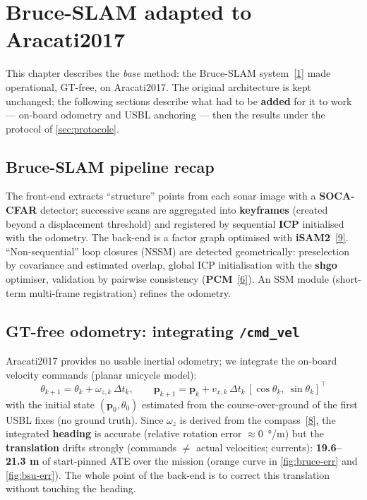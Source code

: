 \section{Bruce-SLAM adapted to Aracati2017}
\label{sec:chap1}

This chapter describes the \emph{base} method: the Bruce-SLAM system~\hyperref[bib:bruceslam]{[1]} made
operational, GT-free, on Aracati2017. The original architecture is kept unchanged;
the following sections describe what had to be \textbf{added} for it to work —
on-board odometry and USBL anchoring — then the results under the protocol of
\autoref{sec:protocole}.

\subsection{Bruce-SLAM pipeline recap}

The front-end extracts ``structure'' points from each sonar image with a
\textbf{SOCA-CFAR} detector; successive scans are aggregated into \textbf{keyframes}
(created beyond a displacement threshold) and registered by sequential \textbf{ICP}
initialised with the odometry. The back-end is a factor graph optimised with
\textbf{iSAM2}~\hyperref[bib:isam2]{[9]}. ``Non-sequential'' loop closures (NSSM) are detected
geometrically: preselection by covariance and estimated overlap, global ICP
initialisation with the \textbf{shgo} optimiser, validation by pairwise consistency
(\textbf{PCM}~\hyperref[bib:pcm]{[6]}). An SSM module (short-term multi-frame registration) refines the
odometry.

\subsection{GT-free odometry: integrating \texttt{/cmd\_vel}}
\label{sec:odom}

Aracati2017 provides no usable inertial odometry; we integrate the on-board velocity
commands (planar unicycle model):
\begin{equation}
\theta_{k+1} = \theta_k + \omega_{z,k}\,\Delta t_k, \qquad
\mathbf{p}_{k+1} = \mathbf{p}_k + v_{x,k}\,\Delta t_k\,[\cos\theta_k,\ \sin\theta_k]^\top
\end{equation}
with the initial state $(\mathbf{p}_0, \theta_0)$ estimated from the
course-over-ground of the first USBL fixes (no ground truth). Since $\omega_z$ is
derived from the compass~\hyperref[bib:aracati]{[8]}, the integrated \textbf{heading} is accurate (relative
rotation error $\approx 0$~°/m) but the \textbf{translation} drifts strongly
(commands $\neq$ actual velocities; currents): \textbf{19.6--21.3 m} of start-pinned
ATE over the mission (orange curve in \autoref{fig:bruce-err} and
\autoref{fig:bsu-err}). The whole point of the back-end is to correct this translation
without touching the heading.

